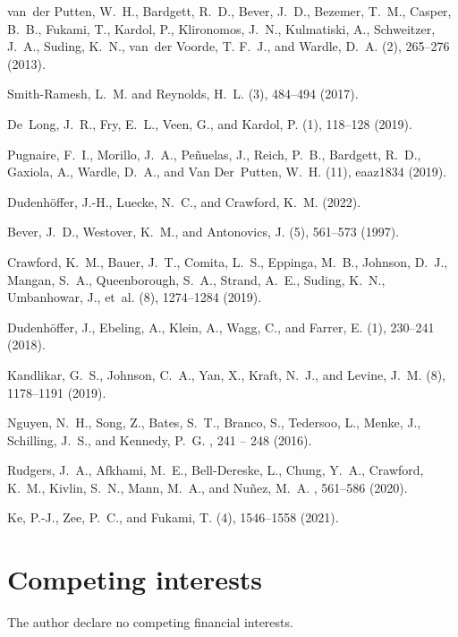 \documentclass[hidelinks,letterpaper, 11pt]{article}
\begin{document}
\clearpage
\begin{thebibliography}{12}
	van~der Putten, W.~H., Bardgett, R.~D., Bever, J.~D., Bezemer, T.~M., Casper,
	B.~B., Fukami, T., Kardol, P., Klironomos, J.~N., Kulmatiski, A., Schweitzer,
	J.~A., Suding, K.~N., van~der Voorde, T. F.~J., and Wardle, D.~A.
	(2), 265--276 (2013).
	
	Smith-Ramesh, L.~M. and Reynolds, H.~L.
	(3), 484--494 (2017).
	
	De~Long, J.~R., Fry, E.~L., Veen, G., and Kardol, P.
	(1), 118--128 (2019).
	
	Pugnaire, F.~I., Morillo, J.~A., Pe{\~n}uelas, J., Reich, P.~B., Bardgett,
	R.~D., Gaxiola, A., Wardle, D.~A., and Van Der~Putten, W.~H.
	(11), eaaz1834 (2019).
	
	Dudenh{\"o}ffer, J.-H., Luecke, N.~C., and Crawford, K.~M.
	 (2022).
	
	Bever, J.~D., Westover, K.~M., and Antonovics, J.
	(5), 561--573 (1997).
	
	Crawford, K.~M., Bauer, J.~T., Comita, L.~S., Eppinga, M.~B., Johnson, D.~J.,
	Mangan, S.~A., Queenborough, S.~A., Strand, A.~E., Suding, K.~N., Umbanhowar,
	J., et~al.
	(8), 1274--1284 (2019).
	
	Dudenh{\"{o}}ffer, J., Ebeling, A., Klein, A., Wagg, C., and Farrer, E.
	(1), 230--241 (2018).
	
	Kandlikar, G.~S., Johnson, C.~A., Yan, X., Kraft, N.~J., and Levine, J.~M.
	(8), 1178--1191 (2019).
	
	Nguyen, N.~H., Song, Z., Bates, S.~T., Branco, S., Tedersoo, L., Menke, J.,
	Schilling, J.~S., and Kennedy, P.~G.
	, 241 -- 248 (2016).
	
	Rudgers, J.~A., Afkhami, M.~E., Bell-Dereske, L., Chung, Y.~A., Crawford,
	K.~M., Kivlin, S.~N., Mann, M.~A., and Nu{\~n}ez, M.~A.
	, 561--586 (2020).
	
	Ke, P.-J., Zee, P.~C., and Fukami, T.
	(4), 1546--1558 (2021).
\end{thebibliography}



\section*{Competing interests}
The author declare no competing financial interests.
\end{document}

